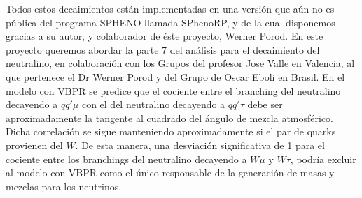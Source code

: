 \begin{ideas}
Todos estos decaimientos están implementadas en una versión que aún no
es pública del programa SPHENO %
llamada
SPhenoRP, y de la cual disponemos gracias a su autor, y colaborador de
éste proyecto, Werner Porod. En este proyecto queremos abordar la
parte 7 del análisis para el decaimiento del neutralino, en
colaboración con los Grupos del profesor Jose Valle en Valencia, al
que pertenece el Dr Werner Porod y del Grupo de Oscar Eboli en Brasil.
En el modelo con VBPR se predice que el cociente entre el branching
del neutralino decayendo a $qq'\mu$ con el del neutralino decayendo a
$qq'\tau$ debe ser aproximadamente la tangente al cuadrado del ángulo de
mezcla atmosférico. Dicha correlación se sigue manteniendo
aproximadamente si el par de quarks provienen del $W$. De esta manera,
una desviación significativa de 1 para el cociente entre los
branchings del neutralino decayendo a $W\mu$ y $W\tau$, podría excluir al
modelo con VBPR como el único responsable de la generación de masas y
mezclas para los neutrinos.


\end{ideas}
